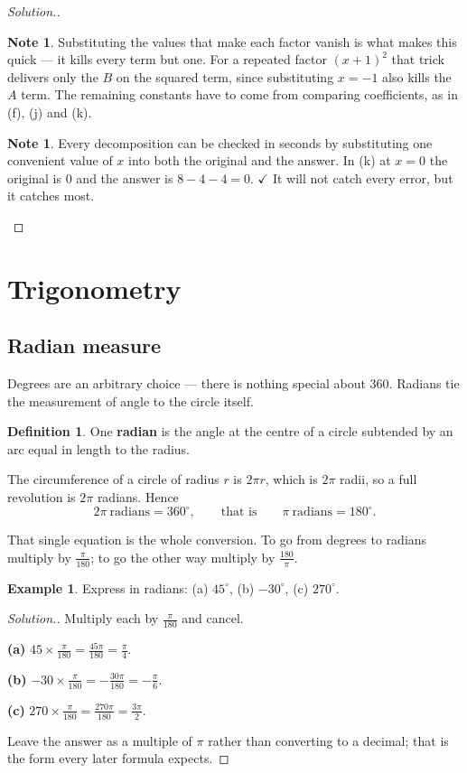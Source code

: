 \documentclass[11pt,a4paper]{article}
\theoremstyle{definition}
\newtheorem{definition}[thm]{Definition}
\newtheorem{example}[thm]{Example}
\newtheorem{note}[thm]{Note}
\newenvironment{solution}
  {\renewcommand{\qedsymbol}{}\begin{proof}[\textit{Solution}.]}
  {\end{proof}}
\let\amscheckmark\checkmark
\renewcommand{\checkmark}{\ensuremath{\amscheckmark}}
\begin{document}
\begin{solution}
\begin{note}
Substituting the values that make each factor vanish is what makes this quick --- it
kills every term but one. For a repeated factor $(x+1)^2$ that trick delivers only the
$B$ on the squared term, since substituting $x=-1$ also kills the $A$ term. The
remaining constants have to come from comparing coefficients, as in (f), (j) and (k).
\end{note}

\begin{note}
Every decomposition can be checked in seconds by substituting one convenient value of
$x$ into both the original and the answer. In (k) at $x=0$ the original is $0$ and the
answer is $8-4-4=0$. $\checkmark$ It will not catch every error, but it catches most.
\end{note}
\end{solution}

\section{Trigonometry}

\subsection{Radian measure}

Degrees are an arbitrary choice --- there is nothing special about $360$. Radians tie
the measurement of angle to the circle itself.

\begin{definition}
One \textbf{radian} is the angle at the centre of a circle subtended by an arc equal in
length to the radius.
\end{definition}

The circumference of a circle of radius $r$ is $2\pi r$, which is $2\pi$ radii, so a
full revolution is $2\pi$ radians. Hence
$$2\pi\ \text{radians}=360^\circ,\qquad\text{that is}\qquad \pi\ \text{radians}=180^\circ.$$

That single equation is the whole conversion. To go from degrees to radians multiply by
$\frac{\pi}{180}$; to go the other way multiply by $\frac{180}{\pi}$.

\begin{example}
Express in radians: (a) $45^\circ$, (b) $-30^\circ$, (c) $270^\circ$.
\end{example}

\begin{solution}
Multiply each by $\frac{\pi}{180}$ and cancel.

\textbf{(a)} $45\times\frac{\pi}{180}=\frac{45\pi}{180}=\frac{\pi}{4}$.

\textbf{(b)} $-30\times\frac{\pi}{180}=-\frac{30\pi}{180}=-\frac{\pi}{6}$.

\textbf{(c)} $270\times\frac{\pi}{180}=\frac{270\pi}{180}=\frac{3\pi}{2}$.

Leave the answer as a multiple of $\pi$ rather than converting to a decimal; that is
the form every later formula expects.
\end{solution}
\end{document}

